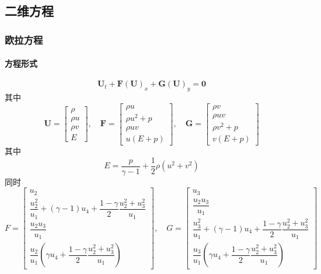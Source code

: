\documentclass{book}
\begin{document}
\subsection{二维方程}
\subsubsection{欧拉方程}
\paragraph{方程形式}
\begin{equation}
  \mathbf{U}_{t}+\mathbf{F}(\mathbf{U})_{x}+\mathbf{G}(\mathbf{U})_{y}=\mathbf{0}
\end{equation}
其中
\begin{equation}
  \mathbf{U}=\left[\begin{array}{c}
      \rho   \\
      \rho u \\
      \rho v \\
      E
    \end{array}\right], \quad \mathbf{F}=\left[\begin{array}{c}
      \rho u       \\
      \rho u^{2}+p \\
      \rho u v     \\
      u(E+p)
    \end{array}\right], \quad \mathbf{G}=\left[\begin{array}{c}
      \rho v       \\
      \rho u v     \\
      \rho v^{2}+p \\
      v(E+p)
    \end{array}\right]
\end{equation}
其中
\begin{equation}
  E=\dfrac{p}{\gamma-1}+\dfrac{1}{2} \rho\left(u^{2}+v^{2}\right)
\end{equation}
同时
\begin{equation}
  F = \begin{bmatrix}
    u_2                                                                          \\
    \dfrac{u_2^2}{u_1}+(\gamma-1)u_4+\dfrac{1-\gamma}{2}\dfrac{u_2^2+u_3^2}{u_1} \\
    \dfrac{u_2u_3}{u_1}                                                          \\
    \dfrac{u_2}{u_1}\left(\gamma u_4+\dfrac{1-\gamma}{2}\dfrac{u_2^2+u_3^2}{u_1}\right)
  \end{bmatrix}
  ,\quad G=\begin{bmatrix}
    u_3                                                                          \\
    \dfrac{u_2u_3}{u_1}                                                          \\
    \dfrac{u_3^2}{u_1}+(\gamma-1)u_4+\dfrac{1-\gamma}{2}\dfrac{u_2^2+u_3^2}{u_1} \\
    \dfrac{u_3}{u_1}\left(\gamma u_4+\dfrac{1-\gamma}{2}\dfrac{u_2^2+u_3^2}{u_1}\right)
  \end{bmatrix}
\end{equation}
\end{document}
